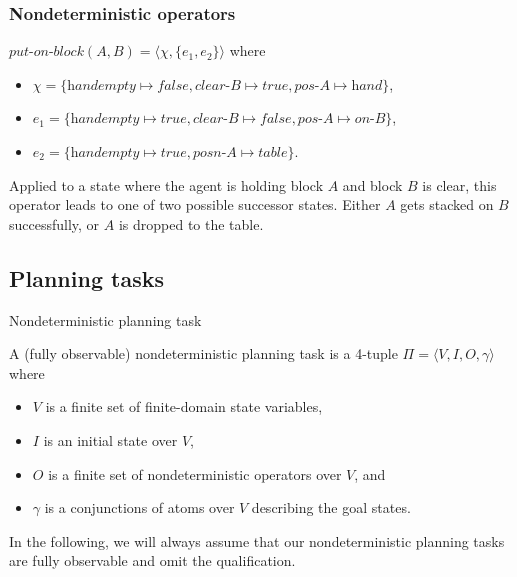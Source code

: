 \documentclass{gkibeamer}
\begin{document}
\begin{frame}
  \frametitle{Nondeterministic operators}
  \begin{example}
    $\textit{put-on-block}(A,B) = \langle \chi, \{ e_1, e_2 \} \rangle$ where
    \begin{itemize}
    \item $\chi = \{ \textit{handempty} \mapsto \textit{false},
      \textit{clear-B} \mapsto \textit{true}, \textit{pos-A} \mapsto
      \textit{hand} \}$,
    \item $e_1 = \{ \textit{handempty} \mapsto \textit{true},
      \textit{clear-B} \mapsto \textit{false}, \textit{pos-A} \mapsto
      \textit{on-B} \}$,
    \item $e_2 = \{ \textit{handempty} \mapsto \textit{true},
      \textit{posn-A} \mapsto \textit{table} \}$.
    \end{itemize}
    
    \medskip

    Applied to a state where the agent is holding block $A$ and block
    $B$ is clear, this operator leads to one of two possible successor
    states. Either $A$ gets stacked on $B$ successfully, or $A$ is
    dropped to the table.
  \end{example}
\end{frame}

\subsection{Planning tasks}

\begin{frame}{Nondeterministic planning task}
  \begin{definition}
    A (fully observable) \alert{nondeterministic planning task} is a 4-tuple
    $\Pi = \langle V,I,O,\gamma\rangle$ where
    \begin{itemize}
    \item $V$ is a finite set of \alert{finite-domain state
      variables},
    \item $I$ is an \alert{initial state} over $V$,
    \item $O$ is a finite set of \alert{nondeterministic operators} over
      $V$, and
    \item $\gamma$ is a conjunctions of atoms over $V$ describing the
      \alert{goal states}.
    \end{itemize}
  \end{definition}

  \smallskip

   In the following, we will always assume that our
  nondeterministic planning tasks are fully observable and omit the
  qualification.

\end{frame}
\end{document}
